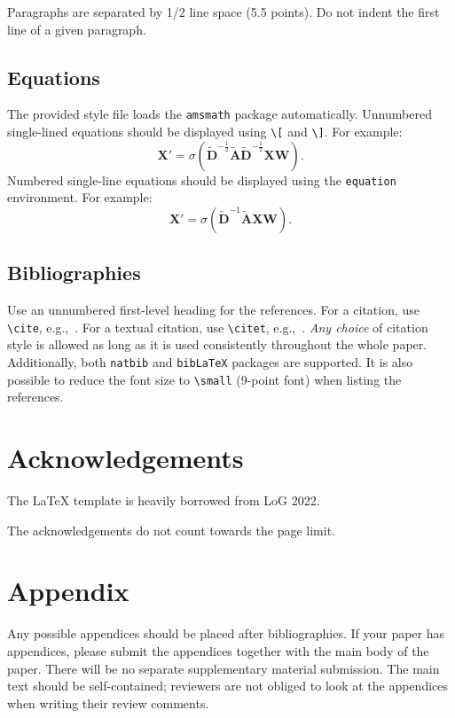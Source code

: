 \documentclass{article}
\begin{document}
Paragraphs are separated by 1/2 line space (5.5 points).
Do not indent the first line of a given paragraph.

\subsection{Equations}

The provided style file loads the \verb+amsmath+ package automatically.
Unnumbered single-lined equations should be displayed using \verb+\[+ and \verb+\]+. For example:
\[
	\mathbf{X}' = \sigma(\widetilde{\mathbf{D}}^{-\frac{1}{2}}\widetilde{\mathbf{A}}\widetilde{\mathbf{D}}^{-\frac{1}{2}} \mathbf{XW}).
\]
Numbered single-line equations should be displayed using the \verb+equation+ environment. For example:
\begin{equation}
	\mathbf{X}' = \sigma(\widetilde{\mathbf{D}}^{-1}\widetilde{\mathbf{A}}\mathbf{XW}).
\end{equation}

\subsection{Bibliographies}

Use an unnumbered first-level heading for the references.
For a citation, use \verb+\cite+, e.g.,~\cite{Kipf:2017tc}.
For a textual citation, use \verb+\citet+, e.g.,~\citet{Velickovic:2018we}.
\emph{Any choice} of citation style is allowed as long as it is used consistently throughout the whole paper.
Additionally, both \verb+natbib+ and \verb+bibLaTeX+ packages are supported.
It is also possible to reduce the font size to \verb+\small+ (9-point font) when listing the references.


\section*{Acknowledgements}

The \LaTeX{} template is heavily borrowed from LoG 2022.

The acknowledgements do not count towards the page limit.




\appendix
\section{Appendix}
Any possible appendices should be placed after bibliographies.
If your paper has appendices, please submit the appendices together with the main body of the paper.
There will be no separate supplementary material submission.
The main text should be self-contained; reviewers are not obliged to look at the appendices when writing their review comments.
\end{document}

